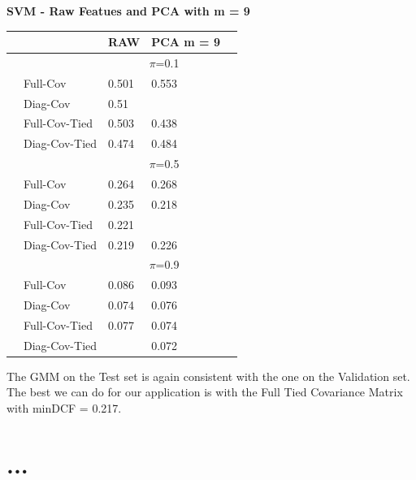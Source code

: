 \documentclass[english]{report}
\begin{document}
\textbf{SVM - Raw Featues and PCA with m = 9}
\begin{table}[H]
    \centering
    \begin{tabular}{ll|l|ll}
        \hline
                                & & RAW & PCA m = 9 \\ \hline
                                & & \multicolumn{2}{c}{$\pi$=0.1} \\ \hline
                                & Full-Cov        & 0.501  & 0.553 \\
                                & Diag-Cov        & 0.51 & \color{red}{0.467} \\
                                & Full-Cov-Tied   & 0.503 & 0.438 \\ 
                                & Diag-Cov-Tied   & 0.474 & 0.484 \\ \hline

                                & & \multicolumn{2}{c}{$\pi$=0.5} \\ \hline
                                & Full-Cov          & 0.264  & 0.268   \\
                                & Diag-Cov          & 0.235  & 0.218 \\
                                & Full-Cov-Tied     & 0.221  & \color{red}{0.217} \\ 
                                & Diag-Cov-Tied     & 0.219  & 0.226 \\ \hline

                                & & \multicolumn{2}{c}{$\pi$=0.9} \\ \hline
                                & Full-Cov          & 0.086  & 0.093  \\
                                & Diag-Cov          & 0.074  & 0.076\\
                                & Full-Cov-Tied     & 0.077  & 0.074\\ 
                                & Diag-Cov-Tied     & \color{red}{0.071}  & 0.072\\  
    \hline
    \end{tabular}
    \label{tab:SVM_RAW_eval}
\end{table}
The GMM on the Test set is again consistent with the one on the Validation set. The best we can do
for our application is with the Full Tied Covariance Matrix with minDCF = 0.217.

\newpage
\section{...}
\end{document}
